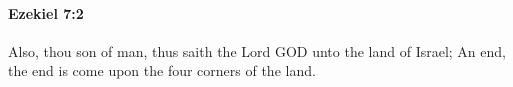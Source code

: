 
		\paragraph{Ezekiel 7:2} %
			\label{EZEKIEL-7-2}

			Also, thou son of man, thus saith the Lord GOD unto the land of Israel; An end, the end is come upon the four corners of the land.


